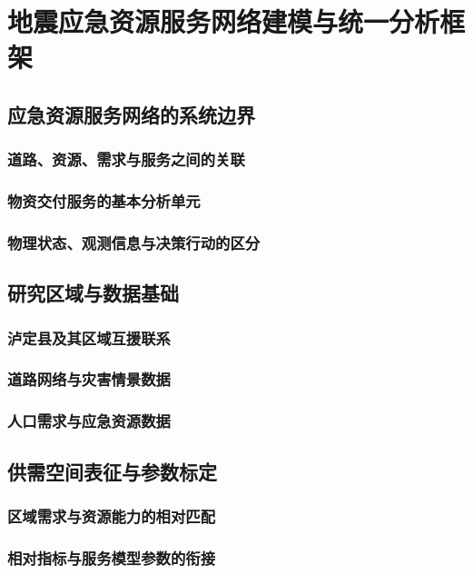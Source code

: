 \chapter{地震应急资源服务网络建模与统一分析框架}
\label{chap:framework}

\section{应急资源服务网络的系统边界}
\subsection{道路、资源、需求与服务之间的关联}
\subsection{物资交付服务的基本分析单元}
\subsection{物理状态、观测信息与决策行动的区分}

\ThesisBlank

\section{研究区域与数据基础}
\subsection{泸定县及其区域互援联系}
\subsection{道路网络与灾害情景数据}
\subsection{人口需求与应急资源数据}

\ThesisBlank

\section{供需空间表征与参数标定}
\subsection{区域需求与资源能力的相对匹配}
\subsection{相对指标与服务模型参数的衔接}
